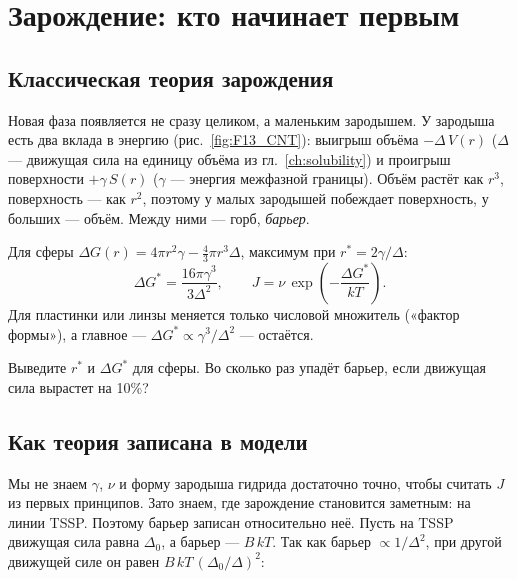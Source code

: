 \chapter{Зарождение: кто начинает первым}\label{ch:nucleation}

\section{Классическая теория зарождения}

Новая фаза появляется не сразу целиком, а маленьким зародышем. У зародыша есть два вклада в
энергию (рис.~\ref{fig:F13_CNT}): выигрыш объёма $-\Delta\,V(r)$ ($\Delta$ --- движущая сила на
единицу объёма из гл.~\ref{ch:solubility}) и проигрыш поверхности $+\gamma\,S(r)$ ($\gamma$ ---
энергия межфазной границы). Объём растёт как $r^3$, поверхность --- как $r^2$, поэтому у малых
зародышей побеждает поверхность, у больших --- объём. Между ними --- горб, \emph{барьер}.


Для сферы $\Delta G(r)=4\pi r^2\gamma-\frac43\pi r^3\Delta$, максимум при $r^*=2\gamma/\Delta$:
\begin{equation}
\Delta G^*=\frac{16\pi\gamma^3}{3\Delta^2},\qquad J=\nu\,\exp\!\left(-\frac{\Delta G^*}{kT}\right).
\end{equation}
Для пластинки или линзы меняется только числовой множитель («фактор формы»), а главное ---
$\Delta G^*\propto\gamma^3/\Delta^2$ --- остаётся.

\begin{exercise}
Выведите $r^*$ и $\Delta G^*$ для сферы. Во сколько раз упадёт барьер, если движущая сила
вырастет на 10\%?
\end{exercise}

\section{Как теория записана в модели}

Мы не знаем $\gamma$, $\nu$ и форму зародыша гидрида достаточно точно, чтобы считать $J$ из
первых принципов. Зато знаем, где зарождение становится заметным: на линии TSSP. Поэтому
барьер записан относительно неё. Пусть на TSSP движущая сила равна $\Delta_0$, а барьер ---
$B\,kT$. Так как барьер $\propto1/\Delta^2$, при другой движущей силе он равен $B\,kT\,(\Delta_0/\Delta)^2$:

